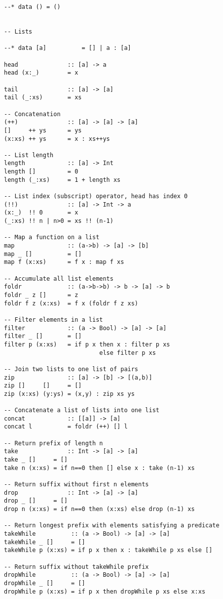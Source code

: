 \documentclass[titlepage,fleqn]{article}
\begin{document}
{\begin{verbatim}
--* data () = ()


-- Lists

--* data [a]          = [] | a : [a]

head              :: [a] -> a
head (x:_)        = x

tail              :: [a] -> [a]
tail (_:xs)       = xs

-- Concatenation
(++)              :: [a] -> [a] -> [a]
[]     ++ ys      = ys
(x:xs) ++ ys      = x : xs++ys

-- List length
length            :: [a] -> Int
length []         = 0
length (_:xs)     = 1 + length xs

-- List index (subscript) operator, head has index 0
(!!)              :: [a] -> Int -> a
(x:_)  !! 0       = x
(_:xs) !! n | n>0 = xs !! (n-1)

-- Map a function on a list
map               :: (a->b) -> [a] -> [b]
map _ []          = []
map f (x:xs)      = f x : map f xs

-- Accumulate all list elements
foldr             :: (a->b->b) -> b -> [a] -> b
foldr _ z []      = z
foldr f z (x:xs)  = f x (foldr f z xs)

-- Filter elements in a list
filter            :: (a -> Bool) -> [a] -> [a]
filter _ []       = []
filter p (x:xs)   = if p x then x : filter p xs
                           else filter p xs

-- Join two lists to one list of pairs
zip               :: [a] -> [b] -> [(a,b)]
zip []     []     = []
zip (x:xs) (y:ys) = (x,y) : zip xs ys

-- Concatenate a list of lists into one list
concat            :: [[a]] -> [a]
concat l          = foldr (++) [] l

-- Return prefix of length n
take              :: Int -> [a] -> [a]
take _ []     = []
take n (x:xs) = if n==0 then [] else x : take (n-1) xs

-- Return suffix without first n elements
drop              :: Int -> [a] -> [a]
drop _ []     = []
drop n (x:xs) = if n==0 then (x:xs) else drop (n-1) xs

-- Return longest prefix with elements satisfying a predicate
takeWhile          :: (a -> Bool) -> [a] -> [a]
takeWhile _ []     = []
takeWhile p (x:xs) = if p x then x : takeWhile p xs else []

-- Return suffix without takeWhile prefix
dropWhile          :: (a -> Bool) -> [a] -> [a]
dropWhile _ []     = []
dropWhile p (x:xs) = if p x then dropWhile p xs else x:xs



\end{verbatim}}
\end{document}
